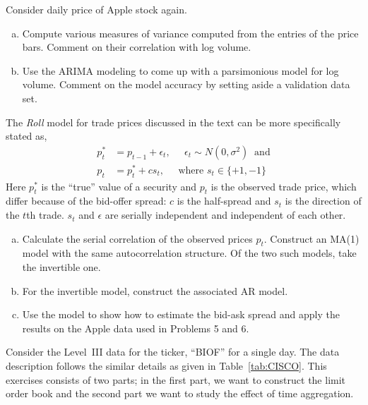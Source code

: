 \prob Consider daily price of Apple stock again.
\begin{enumerate}[(a)]
\item Compute various measures of variance computed from the entries of the price bars. Comment on their correlation with log volume. 
\item Use the ARIMA modeling to come up with a parsimonious model for log volume. Comment on the model accuracy by setting aside a validation data set. \twomedskip
\end{enumerate}


\prob The \textit{Roll} model for trade prices discussed in the text can be more specifically stated as,
	\[
	\begin{aligned}
	p_t^*&= p_{t-1} + \epsilon_t, \;\;\;\;\; \epsilon_t \sim N(0,\sigma^2) \;\;\text{and} \\
	p_t&= p_t^* + c s_t, \;\;\;\;\; \text{where }s_t \in \{+1,-1\}
	\end{aligned}
	\]
Here $p_t^*$ is the ``true'' value of a security and $p_t$ is the observed trade price, which differ because of the bid-offer spread: $c$ is the half-spread and $s_t$ is the direction of the $t$th trade. $s_t$ and $\epsilon$ are serially independent and independent of each other.
\begin{enumerate}[(a)]
\item Calculate the serial correlation of the observed prices $p_t$. Construct an MA(1) model with the same autocorrelation structure. Of the two such models, take the invertible one. 
\item For the invertible model, construct the associated AR model. 
\item Use the model to show how to estimate the bid-ask spread and apply the results on the Apple data used in Problems 5 and 6. \twomedskip
\end{enumerate}


\prob Consider the Level~III data for the ticker, ``BIOF'' for a single day. The data description follows the similar details as given in Table~\ref{tab:CISCO}. This exercises consists of two parts; in the first part, we want to construct the limit order book and the second part we want to study the effect of time aggregation. 

